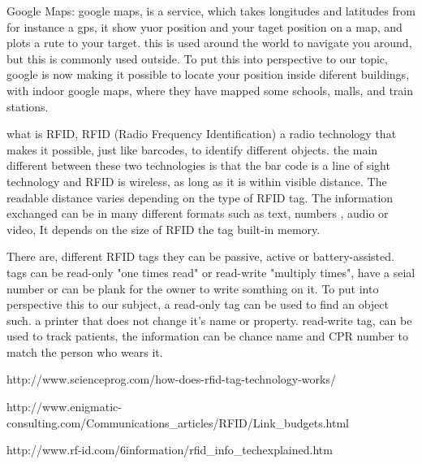 

Google Maps:
google maps, is a service, which takes longitudes and latitudes from for instance a gps, it show yuor position and your taget position on a map, and plots a rute to your target. this is used around the world to navigate you around, but this is commonly used outside. To put this into perspective to our topic, google is now making it possible to locate your position inside diferent buildings, with indoor google maps, where they have mapped some schools, malls, and train stations. 


what is RFID, RFID (Radio Frequency Identification) a radio technology that makes it possible, just like barcodes, to identify different objects. the main different between these two technologies is that the bar code is a line of sight technology and RFID is wireless, as long as it is within visible distance. The readable distance varies depending on the type of RFID tag. The information exchanged can be in many different formats such as text, numbers , audio or video, It depends on the size of RFID the tag built-in memory. 

There are, different RFID tags they can be passive, active or battery-assisted. tags can be read-only "one times read" or read-write "multiply times", have a seial number or can be plank for the owner to write somthing on it. To put into perspective this to our subject, a read-only tag can be used to find an object such. a printer that does not change it's name or property. read-write tag, can be used to track patients, the information can be chance name and CPR number to match the person who wears it.  

http://www.scienceprog.com/how-does-rfid-tag-technology-works/

http://www.enigmatic-consulting.com/Communications_articles/RFID/Link_budgets.html

http://www.rf-id.com/6information/rfid_info_techexplained.htm


